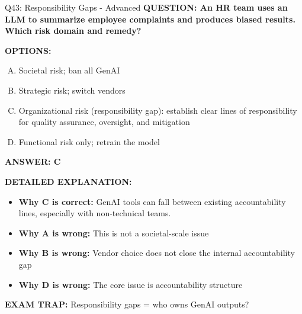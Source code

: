 \documentclass[8pt]{beamer}
\begin{document}
\begin{frame}[shrink=6]{Q43: Responsibility Gaps - Advanced}
\fontsize{6.5}{7.5}\selectfont
\textbf{QUESTION: An HR team uses an LLM to summarize employee complaints and produces biased results. Which risk domain and remedy?}

\vspace{0.1cm}
\textbf{OPTIONS:}
\begin{enumerate}[A.]
\item Societal risk; ban all GenAI
\item Strategic risk; switch vendors
\item Organizational risk (responsibility gap): establish clear lines of responsibility for quality assurance, oversight, and mitigation
\item Functional risk only; retrain the model
\end{enumerate}

\vspace{0.1cm}
\textcolor{myblue}{\textbf{ANSWER: C}}

\vspace{0.1cm}
\textbf{DETAILED EXPLANATION:}
\begin{itemize}
\item \textbf{Why C is correct:} GenAI tools can fall between existing accountability lines, especially with non-technical teams.
\item \textbf{Why A is wrong:} This is not a societal-scale issue
\item \textbf{Why B is wrong:} Vendor choice does not close the internal accountability gap
\item \textbf{Why D is wrong:} The core issue is accountability structure
\end{itemize}

\textcolor{myred}{\textbf{EXAM TRAP:}} Responsibility gaps = who owns GenAI outputs?
\end{frame}
\end{document}
